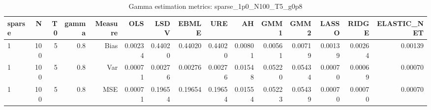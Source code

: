 \begin{table}[!htbp]\centering
\caption{Gamma estimation metrics: sparse_1p0_N100_T5_g0p8}
\label{tab:table1_sparse_1p0_N100_T5_g0p8}
\begin{tabular}{lrrrrrrrrrrrrrr}
\hline
sparse & N & T0 & gamma & Measure & OLS & LSDV & EBMLE & URE & AH & GMM1 & GMM2 & LASSO & RIDGE & ELASTIC_NET \\
\hline
1 & 100 & 5 & 0.8 & Bias & 0.00234 & 0.44020 & 0.44020 & 0.44020 & 0.00801 & 0.00561 & 0.00719 & 0.00139 & 0.00264 & 0.00139 \\
1 & 100 & 5 & 0.8 & Var & 0.00071 & 0.00276 & 0.00276 & 0.00276 & 0.01548 & 0.05220 & 0.05434 & 0.00070 & 0.00069 & 0.00070 \\
1 & 100 & 5 & 0.8 & MSE & 0.00071 & 0.19654 & 0.19654 & 0.19654 & 0.01554 & 0.05223 & 0.05439 & 0.00070 & 0.00070 & 0.00070 \\
\hline
\end{tabular}
\end{table}

